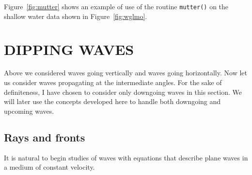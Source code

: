 \par
Figure~\ref{fig:mutter} shows an example of use
of the routine \texttt{mutter()}  on the shallow water data
shown in Figure~\ref{fig:wglmo}.

\section{DIPPING WAVES}

Above we considered waves going vertically
and waves going horizontally.
Now let us consider waves propagating at the intermediate angles.
For the sake of definiteness, I have chosen
to consider only downgoing waves in this section.
We will later use the concepts developed
here to handle both downgoing and upcoming waves.

\subsection{Rays and fronts}
\par
It is natural to begin studies of waves
with equations that describe plane waves
in a medium of constant velocity.

